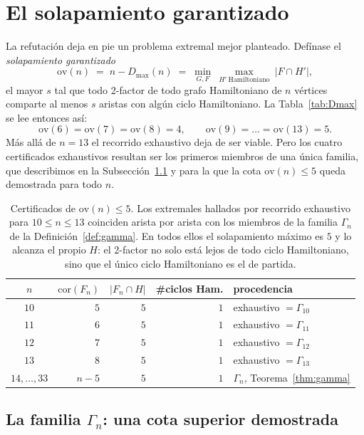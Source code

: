 \documentclass[11pt,a4paper]{article}
\theoremstyle{definition}
\theoremstyle{remark}
\begin{document}
\section{El solapamiento garantizado}\label{sec:ov}

La refutación deja en pie un problema extremal mejor planteado. Defínase el \emph{solapamiento garantizado}
\[
\mathrm{ov}(n)\;=\;n-D_{\max}(n)\;=\;\min_{G,F}\ \max_{H'\ \text{Hamiltoniano}}\ |F\cap H'|,
\]
el mayor $s$ tal que todo 2-factor de todo grafo Hamiltoniano de $n$ vértices comparte al menos $s$ aristas con algún ciclo Hamiltoniano. La Tabla~\ref{tab:Dmax} se lee entonces así:
\[
\mathrm{ov}(6)=\mathrm{ov}(7)=\mathrm{ov}(8)=4,\qquad \mathrm{ov}(9)=\dots=\mathrm{ov}(13)=5 .
\]
Más allá de $n=13$ el recorrido exhaustivo deja de ser viable. Pero los cuatro certificados exhaustivos resultan ser los primeros miembros de una única familia, que describimos en la Subsección~\ref{sub:familiaGamma} y para la que la cota $\mathrm{ov}(n)\le5$ queda demostrada para todo $n$.

\begin{table}[h]
\centering
\begin{tabular}{crrrl}
\toprule
$n$ & $\mathrm{cor}(F_n)$ & $|F_n\cap H|$ & \#ciclos Ham. & procedencia\\
\midrule
$10$ & $5$ & $5$ & $1$ & exhaustivo $=\Gamma_{10}$\\
$11$ & $6$ & $5$ & $1$ & exhaustivo $=\Gamma_{11}$\\
$12$ & $7$ & $5$ & $1$ & exhaustivo $=\Gamma_{12}$\\
$13$ & $8$ & $5$ & $1$ & exhaustivo $=\Gamma_{13}$\\
$14,\dots,33$ & $n-5$ & $5$ & $1$ & $\Gamma_n$, Teorema~\ref{thm:gamma}\\
\bottomrule
\end{tabular}
\caption{Certificados de $\mathrm{ov}(n)\le5$. Los extremales hallados por recorrido exhaustivo para $10\le n\le13$ coinciden arista por arista con los miembros de la familia $\Gamma_n$ de la Definición~\ref{def:gamma}. En todos ellos el solapamiento máximo es $5$ y lo alcanza el propio $H$: el 2-factor no solo está lejos de todo ciclo Hamiltoniano, sino que el único ciclo Hamiltoniano es el de partida.}\label{tab:ov}
\end{table}

\subsection{La familia $\Gamma_n$: una cota superior demostrada}\label{sub:familiaGamma}
\end{document}
